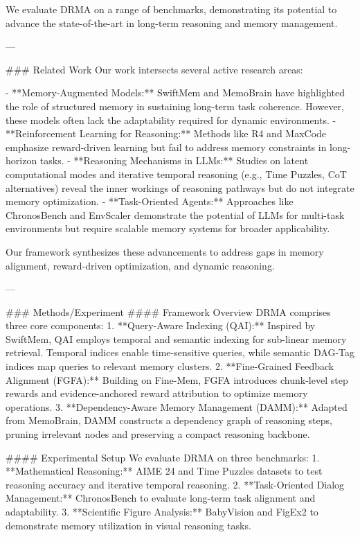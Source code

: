 We evaluate DRMA on a range of benchmarks, demonstrating its potential to advance the state-of-the-art in long-term reasoning and memory management.

---

### Related Work
Our work intersects several active research areas:

- **Memory-Augmented Models:** SwiftMem and MemoBrain have highlighted the role of structured memory in sustaining long-term task coherence. However, these models often lack the adaptability required for dynamic environments.
- **Reinforcement Learning for Reasoning:** Methods like R4 and MaxCode emphasize reward-driven learning but fail to address memory constraints in long-horizon tasks.
- **Reasoning Mechanisms in LLMs:** Studies on latent computational modes and iterative temporal reasoning (e.g., Time Puzzles, CoT alternatives) reveal the inner workings of reasoning pathways but do not integrate memory optimization.
- **Task-Oriented Agents:** Approaches like ChronosBench and EnvScaler demonstrate the potential of LLMs for multi-task environments but require scalable memory systems for broader applicability.

Our framework synthesizes these advancements to address gaps in memory alignment, reward-driven optimization, and dynamic reasoning.

---

### Methods/Experiment
#### Framework Overview
DRMA comprises three core components:
1. **Query-Aware Indexing (QAI):** Inspired by SwiftMem, QAI employs temporal and semantic indexing for sub-linear memory retrieval. Temporal indices enable time-sensitive queries, while semantic DAG-Tag indices map queries to relevant memory clusters.
2. **Fine-Grained Feedback Alignment (FGFA):** Building on Fine-Mem, FGFA introduces chunk-level step rewards and evidence-anchored reward attribution to optimize memory operations.
3. **Dependency-Aware Memory Management (DAMM):** Adapted from MemoBrain, DAMM constructs a dependency graph of reasoning steps, pruning irrelevant nodes and preserving a compact reasoning backbone.

#### Experimental Setup
We evaluate DRMA on three benchmarks:
1. **Mathematical Reasoning:** AIME 24 and Time Puzzles datasets to test reasoning accuracy and iterative temporal reasoning.
2. **Task-Oriented Dialog Management:** ChronosBench to evaluate long-term task alignment and adaptability.
3. **Scientific Figure Analysis:** BabyVision and FigEx2 to demonstrate memory utilization in visual reasoning tasks.

